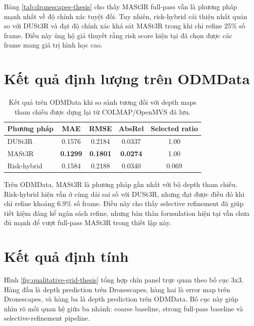 \documentclass[../DoAn.tex]{subfiles}
\begin{document}
Bảng \ref{tab:dronescapes-thesis} cho thấy MASt3R full-pass vẫn là phương pháp mạnh nhất về độ chính xác tuyệt đối. Tuy nhiên, risk-hybrid cải thiện nhất quán so với DUSt3R và đạt độ chính xác khá sát MASt3R trong khi chỉ refine 25\% số frame. Điều này ủng hộ giả thuyết rằng risk score hiện tại đã chọn được các frame mang giá trị hình học cao.

\section{Kết quả định lượng trên ODMData}

\begin{table}[t]
\centering
\small
\begin{tabular}{lcccc}
\toprule
\textbf{Phương pháp} & \textbf{MAE} & \textbf{RMSE} & \textbf{AbsRel} & \textbf{Selected ratio} \\
\midrule
DUSt3R & 0.1576 & 0.2184 & 0.0337 & 1.00 \\
MASt3R & \textbf{0.1299} & \textbf{0.1801} & \textbf{0.0274} & 1.00 \\
Risk-hybrid & 0.1584 & 0.2188 & 0.0340 & 0.069 \\
\bottomrule
\end{tabular}
\caption{Kết quả trên ODMData khi so sánh tương đối với depth maps tham chiếu được dựng lại từ COLMAP/OpenMVS đã lưu.}
\label{tab:odm-thesis}
\end{table}

Trên ODMData, MASt3R là phương pháp gần nhất với bộ depth tham chiếu. Risk-hybrid hiện vẫn ở cùng dải sai số với DUSt3R, nhưng đạt được điều đó khi chỉ refine khoảng 6.9\% số frame. Điều này cho thấy selective refinement đã giúp tiết kiệm đáng kể ngân sách refine, nhưng bản thân formulation hiện tại vẫn chưa đủ mạnh để vượt full-pass MASt3R trong thiết lập này.

\section{Kết quả định tính}

Hình \ref{fig:qualitative-grid-thesis} tổng hợp chín panel trực quan theo bố cục 3x3. Hàng đầu là depth prediction trên Dronescapes, hàng hai là error map trên Dronescapes, và hàng ba là depth prediction trên ODMData. Bố cục này giúp nhìn rõ mối quan hệ giữa ba nhánh: coarse baseline, strong full-pass baseline và selective-refinement pipeline.
\end{document}

